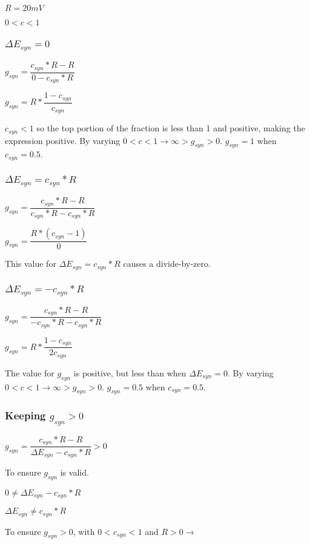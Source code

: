 \documentclass[12pt, letterpaper, oneside, notitlepage, onecolumn]{article}
\begin{document}
$R = 20mV$

$0 < c < 1$

\subsubsection{$\Delta E_{syn} = 0$}

$g_{syn} = \dfrac{c_{syn} * R - R}{0 - c_{syn} * R}$

$g_{syn} = R * \dfrac{1 - c_{syn}}{c_{syn}}$

$c_{syn} < 1$ so the top portion of the fraction is less than 1 and positive, making the expression positive.
By varying $0 < c < 1 \rightarrow \infty > g_{syn} > 0$. $g_{syn} = 1$ when $c_{syn} = 0.5$.

\subsubsection{$\Delta E_{syn} = c_{syn} * R$}

$g_{syn} = \dfrac{c_{syn} * R - R}{c_{syn} * R - c_{syn} * R}$

$g_{syn} = \dfrac{R * (c_{syn} - 1)}{0}$

This value for $\Delta E_{syn} = c_{syn} * R$ causes a divide-by-zero.

\subsubsection{$\Delta E_{syn} = -c_{syn} * R$}

$g_{syn} = \dfrac{c_{syn} * R - R}{-c_{syn} * R - c_{syn} * R}$

$g_{syn} = R * \dfrac{1 - c_{syn}}{2 c_{syn}}$

The value for $g_{syn}$ is positive, but less than when $\Delta E_{syn} = 0$.
By varying $0 < c < 1 \rightarrow \infty > g_{syn} > 0$. $g_{syn} = 0.5$ when $c_{syn} = 0.5$.

\subsubsection{Keeping $g_{syn} > 0$}

$g_{syn} = \dfrac{c_{syn} * R - R}{\Delta E_{syn} - c_{syn} * R} > 0$

To ensure $g_{syn}$ is valid.

$0 \neq \Delta E_{syn} - c_{syn} * R$

$\Delta E_{syn} \neq c_{syn} * R$

To ensure $g_{syn} > 0$, with $0 < c_{syn} < 1$ and $R > 0 \rightarrow$
\end{document}
